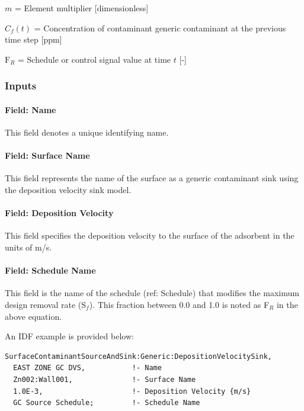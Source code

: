 \(m\) = Element multiplier {[}dimensionless{]}

\(C_f (t)\) = Concentration of contaminant generic contaminant at the previous time step {[}ppm{]}

\(\mathrm{F}_{R}\) = Schedule or control signal value at time \(t\) {[}-{]}

\subsubsection{Inputs}\label{inputs-16-005}

\paragraph{Field: Name}\label{field-name-16-004}

This field denotes a unique identifying name.

\paragraph{Field: Surface Name}\label{field-surface-name-4-000}

This field represents the name of the surface as a generic contaminant sink using the deposition velocity sink model.

\paragraph{Field: Deposition Velocity}\label{field-deposition-velocity}

This field specifies the deposition velocity to the surface of the adsorbent in the units of m/s.

\paragraph{Field: Schedule Name}\label{field-schedule-name-9}

This field is the name of the schedule (ref: Schedule) that modifies the maximum design removal rate (S\(_{f}\)). This fraction between 0.0 and 1.0 is noted as F\(_{R}\) in the above equation.

An IDF example is provided below:

\begin{lstlisting}
SurfaceContaminantSourceAndSink:Generic:DepositionVelocitySink,
  EAST ZONE GC DVS,           !- Name
  Zn002:Wall001,              !- Surface Name
  1.0E-3,                     !- Deposition Velocity {m/s}
  GC Source Schedule;         !- Schedule Name
\end{lstlisting}

